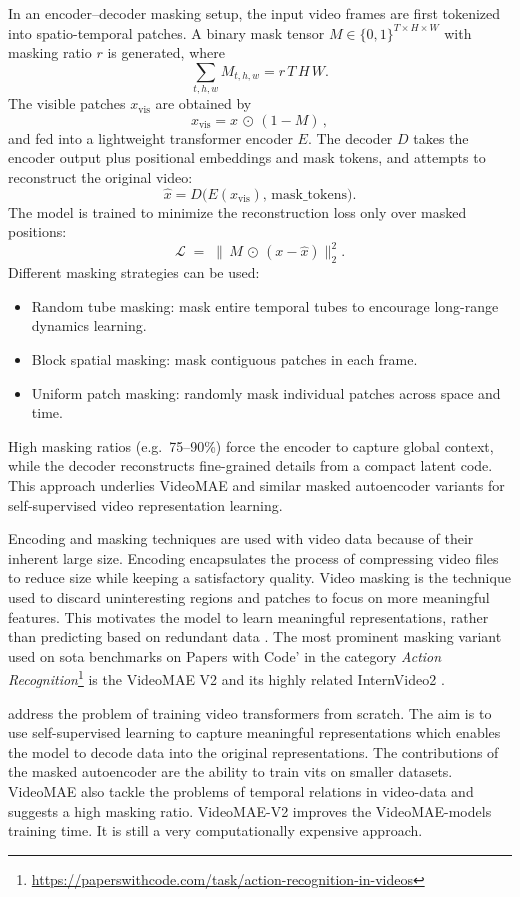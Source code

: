 In an encoder–decoder masking setup, the input video frames are first tokenized into spatio-temporal patches. A binary mask tensor \(M\in\{0,1\}^{T\times H\times W}\) with masking ratio \(r\) is generated, where
\[
\sum_{t,h,w} M_{t,h,w} = r\,T\,H\,W.
\]
The visible patches \(x_\text{vis}\) are obtained by
\[
x_\text{vis} = x \,\odot\,(1 - M)\,,
\]
and fed into a lightweight transformer encoder \(E\). The decoder \(D\) takes the encoder output plus positional embeddings and mask tokens, and attempts to reconstruct the original video:
\[
\hat{x} = D\bigl(E(x_\text{vis}),\,\text{mask\_tokens}\bigr).
\]
The model is trained to minimize the reconstruction loss only over masked positions:
\[
\mathcal{L} \;=\; \bigl\lVert\,M \,\odot\,(x - \hat{x})\bigr\rVert_2^2.
\]
Different masking strategies can be used:
\begin{itemize}
    \item Random tube masking: mask entire temporal tubes to encourage long-range dynamics learning.
    \item Block spatial masking: mask contiguous patches in each frame.
    \item Uniform patch masking: randomly mask individual patches across space and time.
\end{itemize}
High masking ratios (e.g.\ 75–90\%) force the encoder to capture global context, while the decoder reconstructs fine-grained details from a compact latent code. This approach underlies VideoMAE and similar masked autoencoder variants for self-supervised video representation learning.


Encoding and masking techniques are used with video data because of their inherent large size. Encoding encapsulates the process of compressing video files to reduce size while keeping a satisfactory quality. Video masking is the technique used to discard uninteresting regions and patches to focus on more meaningful features. This motivates the model to learn meaningful representations, rather than predicting based on redundant data \cite{tong_videomae_2022}. The most prominent masking variant used on \acrshort{sota} benchmarks on Papers with Code' in the category \textit{Action Recognition}\footnote{\url{https://paperswithcode.com/task/action-recognition-in-videos}} is the VideoMAE V2 \cite{wang_videomae_2023} and its highly related InternVideo2 \cite{wang_internvideo2_2024}. 

\textcite{tong_videomae_2022} address the problem of training video transformers from scratch. The aim is to use self-supervised learning to capture meaningful representations which enables the model to decode data into the original representations. The contributions of the masked autoencoder \cite{tong_videomae_2022} are the ability to train \acrshort{vit}s on smaller datasets. VideoMAE \cite{tong_videomae_2022} also tackle the problems of temporal relations in video-data and suggests a high masking ratio. VideoMAE-V2 \cite{wang_videomae_2023} improves the VideoMAE-models training time. It is still a very computationally expensive approach. 

